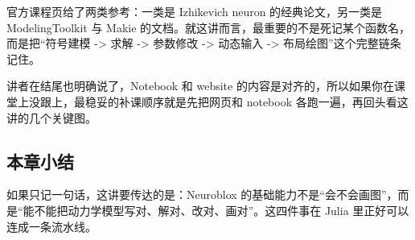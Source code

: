 \documentclass[a4paper]{article}
\begin{document}
官方课程页给了两类参考：一类是 Izhikevich neuron 的经典论文，另一类是 ModelingToolkit 与 Makie 的文档。就这讲而言，最重要的不是死记某个函数名，而是把“符号建模 -> 求解 -> 参数修改 -> 动态输入 -> 布局绘图”这个完整链条记住。

讲者在结尾也明确说了，Notebook 和 website 的内容是对齐的，所以如果你在课堂上没跟上，最稳妥的补课顺序就是先把网页和 notebook 各跑一遍，再回头看这讲的几个关键图。

\subsection{本章小结}
如果只记一句话，这讲要传达的是：Neuroblox 的基础能力不是“会不会画图”，而是“能不能把动力学模型写对、解对、改对、画对”。这四件事在 Julia 里正好可以连成一条流水线。
\end{document}
